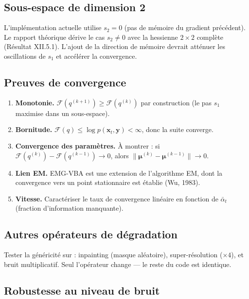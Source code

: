 \documentclass[12pt]{article}
\newcommand{\y}{\boldsymbol{y}}
\newcommand{\x}{\boldsymbol{x}}
\newcommand{\alt}{\bar\alpha_t}
\begin{document}
\subsection{Sous-espace de dimension 2}

L'implémentation actuelle utilise $s_2 = 0$ (pas de mémoire du gradient précédent). Le rapport théorique \cite{rapport_theorique} dérive le cas $s_2 \neq 0$ avec la hessienne $2 \times 2$ complète (Résultat XII.5.1). L'ajout de la direction de mémoire devrait atténuer les oscillations de $s_1$ et accélérer la convergence.

\subsection{Preuves de convergence}

\begin{enumerate}
    \item \textbf{Monotonie.} $\mathcal{F}(q^{(k+1)}) \geq \mathcal{F}(q^{(k)})$ par construction (le pas $s_1$ maximise dans un sous-espace).
    \item \textbf{Bornitude.} $\mathcal{F}(q) \leq \log p(\x_t, \y) < \infty$, donc la suite converge.
    \item \textbf{Convergence des paramètres.} À montrer : si $\mathcal{F}(q^{(k)}) - \mathcal{F}(q^{(k-1)}) \to 0$, alors $\|\boldsymbol{\mu}^{(k)} - \boldsymbol{\mu}^{(k-1)}\| \to 0$.
    \item \textbf{Lien EM.} EMG-VBA est une extension de l'algorithme EM, dont la convergence vers un point stationnaire est établie (Wu, 1983).
    \item \textbf{Vitesse.} Caractériser le taux de convergence linéaire en fonction de $\alt$ (fraction d'information manquante).
\end{enumerate}

\subsection{Autres opérateurs de dégradation}

Tester la généricité sur : inpainting (masque aléatoire), super-résolution ($\times 4$), et bruit multiplicatif. Seul l'opérateur change --- le reste du code est identique.

\subsection{Robustesse au niveau de bruit}
\end{document}
